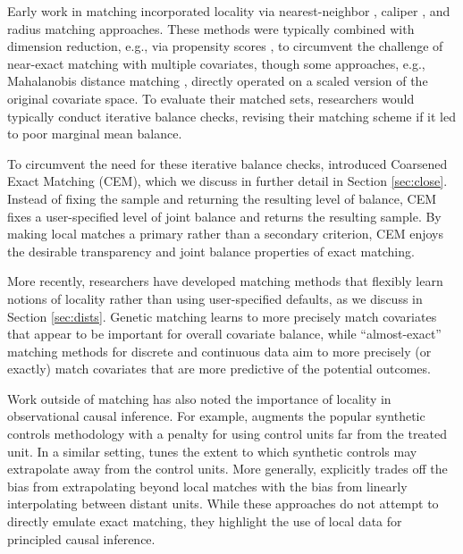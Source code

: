 \documentclass{article}
\begin{document}
Early work in matching incorporated locality via nearest-neighbor \citep{rubin1973matching}, caliper \citep{cochran1973controlling, rosenbaum1985constructing}, and radius matching \citep{dehejia2002propensity} approaches.
These methods were typically combined with dimension reduction, e.g., via propensity scores \citep{rosenbaum1983central}, to circumvent the challenge of near-exact matching with multiple covariates,
though some approaches, e.g., Mahalanobis distance matching \citep{rubin2000combining}, directly operated on a scaled version of the original covariate space.
To evaluate their matched sets, researchers would typically conduct iterative balance checks, revising their matching scheme if it led to poor marginal mean balance.

To circumvent the need for these iterative balance checks, \citet{iacus2012causal} introduced Coarsened Exact Matching (CEM), which we discuss in further detail in Section \ref{sec:close}.
Instead of fixing the sample and returning the resulting level of balance, CEM fixes a user-specified level of joint balance and returns the resulting sample.
By making local matches a primary rather than a secondary criterion, CEM enjoys the desirable transparency and joint balance properties of exact matching.

More recently, researchers have developed matching methods that flexibly learn notions of locality rather than using user-specified defaults, as we discuss in Section \ref{sec:dists}.
Genetic matching \citep{diamond2013genetic} learns to more precisely match covariates that appear to be important for overall covariate balance, while ``almost-exact'' matching methods for discrete \citep{dieng2019interpretable, wang2021flame} and continuous \citep{morucci2020adaptive, parikh2022malts} data aim to more precisely (or exactly) match covariates that are more predictive of the potential outcomes.

Work outside of matching has also noted the importance of locality in observational causal inference.
For example, \citet{abadie2021penalized} augments the popular synthetic controls methodology with a penalty for using control units far from the treated unit.
In a similar setting, \citet{ben2021augmented} tunes the extent to which synthetic controls may extrapolate away from the control units.
More generally, \citet{kellogg2021combining} explicitly trades off the bias from extrapolating beyond local matches with the bias from linearly interpolating between distant units.
While these approaches do not attempt to directly emulate exact matching, they highlight the use of local data for principled causal inference.
\end{document}
